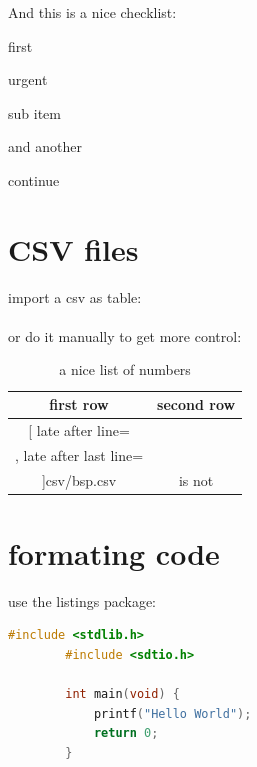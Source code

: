 \documentclass[	%
		fontsize=11pt,  %
		a4paper,	    %
		twoside,		%
		english,		%
		sans,			%
		f1,				%
	]{HsH-report}		%
\begin{document}
		\pagebreak
		And this is a nice checklist:
		\begin{checklist}
			\item first
			\item urgent
			\begin{checklist}
				\item sub item
				\item and another
			\end{checklist}
			\item continue
		\end{checklist}



	\section{CSV files}
		\label{sec: messwerte}
		import a csv as table:\\
		\\

		or do it manually to get more control:
		\begin{table}
			\caption{a nice list of numbers}
			\begin{tabular}{c|c}
				first row & second row \\\hline\hline
				\csvreader[
					late after line=\\\hline,
					late after last line=\\\hline
				]{csv/bsp.csv}{}{number: $\csvcoli\,\metre$ & is not \csvcoliii}
			\end{tabular}
		\end{table}


\section{formating code}
	\label{sec: code}
	use the listings package:
	\begin{lstlisting}[language=c,gobble=8]
		#include <stdlib.h>
		#include <sdtio.h>

		int main(void) {
			printf("Hello World");
			return 0;
		}
	\end{lstlisting}



\clearpage
{} %
\recalctypearea
\end{document}
